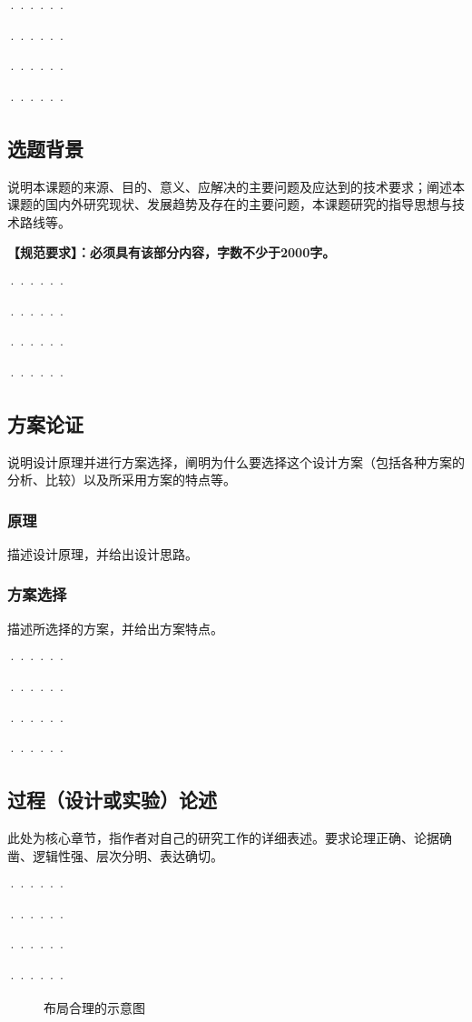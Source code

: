 \documentclass[a4paper, 12pt, twoside]{ctexart}
\begin{document}
······

······

······

······


\subsection{选题背景}
说明本课题的来源、目的、意义、应解决的主要问题及应达到的技术要求；阐述本课题的国内外研究现状、发展趋势及存在的主要问题，本课题研究的指导思想与技术路线等。

\textbf{【规范要求】：必须具有该部分内容，字数不少于2000字。}

······

······

······

······


\subsection{方案论证}
说明设计原理并进行方案选择，阐明为什么要选择这个设计方案（包括各种方案的分析、比较）以及所采用方案的特点等。

\subsubsection{原理}
描述设计原理，并给出设计思路。

\subsubsection{方案选择}
描述所选择的方案，并给出方案特点。

······

······

······

······


\subsection{过程（设计或实验）论述}
此处为核心章节，指作者对自己的研究工作的详细表述。要求论理正确、论据确凿、逻辑性强、层次分明、表达确切。

······

······

······

······

\begin{figure}[htbp]
    \centering
    \caption{布局合理的示意图}
\end{figure}
\end{document}

